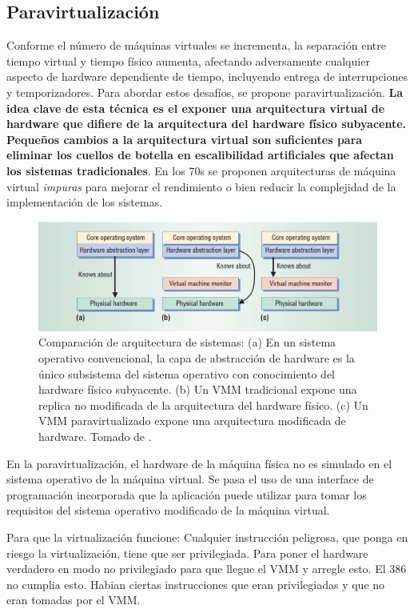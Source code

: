 \documentclass[12pt, times]{simauth}
\begin{document}
\subsection{Paravirtualización}
Conforme el número de máquinas virtuales se incrementa, la separación entre tiempo virtual y tiempo físico aumenta, afectando adversamente cualquier aspecto de hardware dependiente de tiempo, incluyendo entrega de interrupciones y temporizadores. Para abordar estos desafíos, se propone paravirtualización. \textbf{La idea clave de esta técnica es el exponer una arquitectura virtual de hardware que difiere de la arquitectura del hardware físico subyacente. Pequeños cambios a la arquitectura virtual son suficientes para eliminar los cuellos de botella en escalibilidad artificiales que afectan los sistemas tradicionales}. En los 70s se proponen arquitecturas de máquina virtual \emph{impuras} para mejorar el rendimiento o bien reducir la complejidad de la implementación de los sistemas. \cite{whitaker}


\begin{figure}[h]
\centering
\includegraphics[width=1.0\textwidth]{paravirtualizacion}
\caption{Comparación de arquitectura de sistemas: (a) En un sistema operativo convencional, la capa de abstracción de hardware es la único subsistema del sistema operativo con conocimiento del hardware físico subyacente. (b) Un VMM tradicional expone una replica no modificada de la arquitectura del hardware físico. (c) Un VMM paravirtualizado expone una arquitectura modificada de hardware. Tomado de \cite{whitaker}.}
\end{figure}

En la paravirtualización, el hardware de la máquina física no es simulado en el sistema operativo de la máquina virtual. Se pasa el uso de una interface de programación incorporada que la aplicación puede utilizar para tomar los requisitos del sistema operativo modificado de la máquina virtual.


Para que la virtualización funcione:
Cualquier instrucción peligrosa, que ponga en riesgo la virtualización, tiene que ser privilegiada. Para poner el hardware verdadero en modo no privilegiado para que llegue el VMM y arregle esto. El 386 no cumplia esto. Habian ciertas instrucciones que eran privilegiadas y que no eran tomadas por el VMM.
\end{document}
